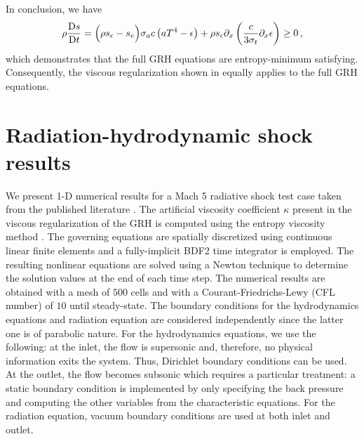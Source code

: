 \documentclass{mc2015}
\begin{document}
In conclusion, we have 
\begin{equation} 
\rho \frac{\textrm{D} s}{\textrm{D} t} = \Big( \rho s_\epsilon -s_e \Big)  \sigma_a c \left( a T^4 - \epsilon \right) +   \rho s_\epsilon \partial_x \left( \frac{c}{3 \sigma_t} \partial_x \epsilon \right) \geq 0 \,,
\end{equation}
which demonstrates that the full GRH equations are entropy-minimum satisfying. Consequently, the viscous regularization shown in  equally applies to the full GRH equations. 

\section{Radiation-hydrodynamic shock results}\label{sec:rez}
%
We present 1-D numerical results for a Mach 5 radiative shock test case taken from the published literature \cite{EdwardsMorelLowrie}. The artificial viscosity coefficient $\kappa$ present in the viscous regularization of the GRH is computed using the entropy viscosity method \cite{jlg1,jlg2,our_jcp_radhy_paper}. The governing equations are spatially discretized using continuous linear finite elements and a fully-implicit BDF2 time integrator is employed. The resulting nonlinear equations are solved using a Newton technique to determine the solution values at the end of each time step. The numerical results are obtained with a mesh of $500$ cells and with a Courant-Friedrichs-Lewy (CFL number) of $10$ until steady-state. The boundary conditions for the hydrodynamics equations and radiation equation are considered independently since the latter one is of parabolic nature. For the hydrodynamics equations, we use the following: at the inlet, the flow is supersonic and, therefore, no physical information exits the system. Thus, Dirichlet boundary conditions can be used. At the outlet, the flow becomes subsonic which requires a particular treatment: a static boundary condition is implemented by only specifying the back pressure and computing the other variables from the characteristic equations. For the radiation equation, vacuum boundary conditions are used at both inlet and outlet. \\
\end{document}
